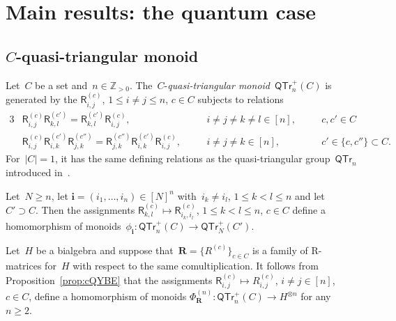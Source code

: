 \documentclass[12pt, reqno]{amsart}
\newcommand{\sfR}{\mathsf{R}}
\theoremstyle{definition}
\numberwithin{equation}{section}
\newcommand{\tensor}{\otimes}
\newcommand{\ZZ}{{\mathbb Z}}
\begin{document}
\section{Main results: the quantum case}\label{sect:main quantum}

\subsection{\texorpdfstring{$C$}{C}-quasi-triangular monoid}\label{subs:QTR(C)}
Let~$C$ be a set and~$n\in\ZZ_{>0}$.
The~$C$-{\em quasi-triangular monoid}~$\mathsf{QTr}^+_n(C)$ is generated by
the $\sfR_{i,j}^{(c)}$, $1\le i\not=j\le n$, $c\in C$ subjects to relations
\begin{alignat}{3}
&\sfR_{i,j}^{(c)}\sfR_{k,l}^{(c')}=\sfR_{k,l}^{(c')}\sfR_{i,j}^{(c)},&&
i\not=j\not=k\not=l\in[n], &\quad & c,c'\in C \label{eq:defn rel QTr comm}
\\
\label{eq:defn rel QTr}
&\sfR_{i,j}^{(c)} \sfR_{i,k}^{(c')} \sfR_{j,k}^{(c'')}=\sfR_{j,k}^{(c'')}\sfR_{i,k}^{(c')} \sfR_{i,j}^{(c)},&\quad&  i\not=j\not=k\in[n], && c'\in\{c,c''\}\subset C.
\end{alignat}
For~$|C|=1$, it 
has the same defining relations as the quasi-triangular group~$\mathsf{QTr}_n$
introduced in~\cite{BEER}.

Let~$N\ge n$, let $\mathbf i=(i_1,\dots,i_n)\in [N]^n$ with~$i_k\not=i_l$, $1\le k<l\le n$ and let~$C'\supset C$. Then the assignments $\sfR_{k,l}^{(c)}\mapsto 
\sfR_{i_k,i_l}^{(c)}$, $1\le k<l\le n$, $c\in C$
define a homomorphism of monoids~$\phi_{\mathbf i}:\mathsf{QTr}^+_n(C)\to \mathsf{QTr}^+_N(C')$.


Let~$H$ be a bialgebra and suppose that~$\boldsymbol R=\{R^{(c)}\}_{c\in C}$ is a family of R-matrices for~$H$ with respect to the same comultiplication. It follows from Proposition~\ref{prop:cQYBE} that
the assignments $\mathsf R_{i,j}^{(c)}\mapsto 
R_{i,j}^{(c)}$, $i\not=j\in[n]$, $c\in C$, define a homomorphism of monoids 
$\Phi^{(n)}_{\boldsymbol R}:\mathsf{QTr}^+_n(C)\to H^{\tensor n}$ for any~$n\ge 2$.
\end{document}
